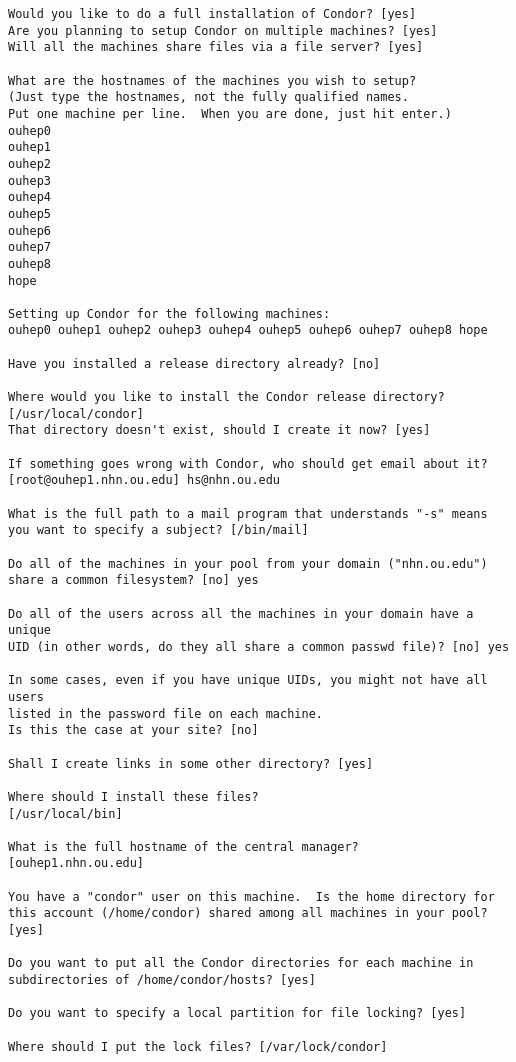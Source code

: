 \documentclass{revtex4}
\begin{document}
\begin{appendix}
\begin{verbatim}
Would you like to do a full installation of Condor? [yes] 
Are you planning to setup Condor on multiple machines? [yes] 
Will all the machines share files via a file server? [yes] 

What are the hostnames of the machines you wish to setup?
(Just type the hostnames, not the fully qualified names.
Put one machine per line.  When you are done, just hit enter.)
ouhep0
ouhep1
ouhep2
ouhep3
ouhep4
ouhep5
ouhep6
ouhep7
ouhep8
hope

Setting up Condor for the following machines:
ouhep0 ouhep1 ouhep2 ouhep3 ouhep4 ouhep5 ouhep6 ouhep7 ouhep8 hope

Have you installed a release directory already? [no] 

Where would you like to install the Condor release directory?
[/usr/local/condor] 
That directory doesn't exist, should I create it now? [yes] 

If something goes wrong with Condor, who should get email about it?
[root@ouhep1.nhn.ou.edu] hs@nhn.ou.edu

What is the full path to a mail program that understands "-s" means
you want to specify a subject? [/bin/mail] 

Do all of the machines in your pool from your domain ("nhn.ou.edu")
share a common filesystem? [no] yes

Do all of the users across all the machines in your domain have a unique
UID (in other words, do they all share a common passwd file)? [no] yes

In some cases, even if you have unique UIDs, you might not have all users
listed in the password file on each machine.
Is this the case at your site? [no] 

Shall I create links in some other directory? [yes] 

Where should I install these files?
[/usr/local/bin] 

What is the full hostname of the central manager?
[ouhep1.nhn.ou.edu] 

You have a "condor" user on this machine.  Is the home directory for
this account (/home/condor) shared among all machines in your pool?
[yes] 

Do you want to put all the Condor directories for each machine in
subdirectories of /home/condor/hosts? [yes] 

Do you want to specify a local partition for file locking? [yes] 

Where should I put the lock files? [/var/lock/condor] 


\end{verbatim}
\end{appendix}
\end{document}
